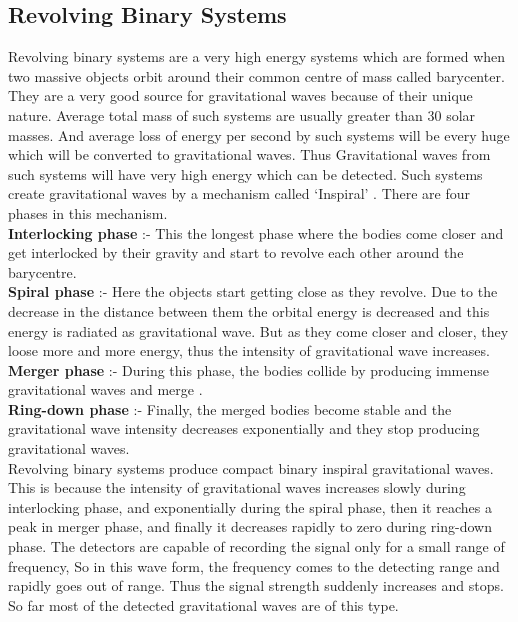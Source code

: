 \subsection{Revolving Binary Systems}

Revolving binary systems are a very high energy systems which are formed when two massive objects orbit around their common centre of mass called barycenter. They are a very good source for gravitational waves because of their unique nature. Average total mass of such systems are usually greater than 30 solar masses. And average loss of energy per second by such systems will be every huge which will be converted to gravitational waves. Thus Gravitational waves from such systems will have very high energy which can be detected. Such systems create gravitational waves by a mechanism called `Inspiral' \cite{van_der_Sluys_2008}. There are four phases in this mechanism. \\

\textbf{Interlocking phase} :- This the longest phase where the bodies come closer and get interlocked by their gravity and start to revolve each other around the barycentre. \\

\textbf{Spiral phase} :- Here the objects start getting close as they revolve. Due to the decrease in the distance between them the orbital energy is decreased and this energy is radiated as gravitational wave. But as they come closer and closer, they loose more and more energy, thus the intensity of gravitational wave increases.\\

\textbf{Merger phase} :- During this phase, the bodies collide by producing immense gravitational waves and merge \cite{article}. \\

\textbf{Ring-down phase} :- Finally, the merged bodies become stable and the gravitational wave intensity decreases exponentially and they stop producing gravitational waves. \\

Revolving binary systems produce compact binary inspiral gravitational waves. This is because the intensity of gravitational waves increases slowly during interlocking phase, and exponentially during the spiral phase, then it reaches a peak in merger phase, and finally it decreases rapidly to zero during ring-down phase. The detectors are capable of recording the signal only for a small range of frequency, So in this wave form, the frequency comes to the detecting range and rapidly goes out of range. Thus the signal strength suddenly increases and stops. So far most of the detected gravitational waves are of this type.

